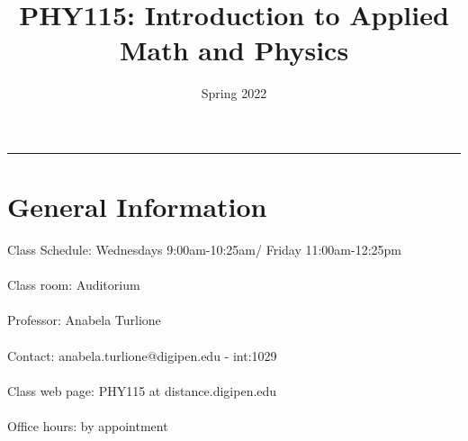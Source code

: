 \documentclass[12pt]{article}
\title{PHY115: Introduction to Applied Math and Physics}
\author{Spring 2022}
\date{}
\newcommand{\blankline}{\quad\pagebreak[2]}
\begin{document}
\maketitle









\hrule



\section*{General Information }

Class Schedule: Wednesdays 9:00am-10:25am/ Friday 11:00am-12:25pm \\ 
\\
Class room: Auditorium\\
\\
Professor: Anabela Turlione\\
\\
Contact: anabela.turlione@digipen.edu - int:1029\\
\\
Class web page: PHY115 at distance.digipen.edu\\
\\
Office hours: by appointment\\


\end{document}
